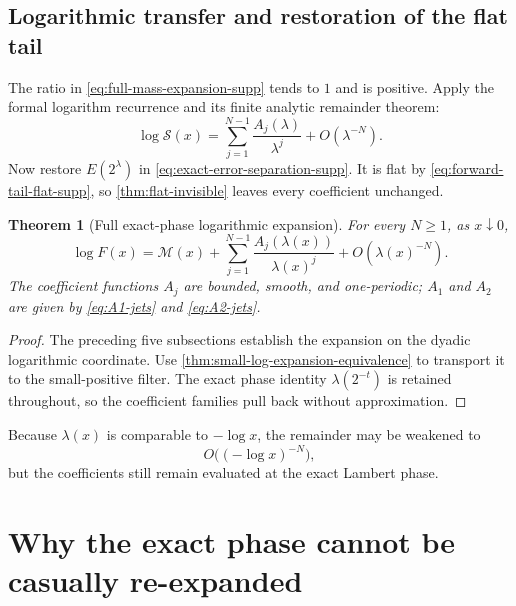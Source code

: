 \documentclass[11pt,oneside]{article}
\newtheorem{theorem}{Theorem}[section]
\theoremstyle{definition}
\theoremstyle{remark}
\begin{document}
\subsection{Logarithmic transfer and restoration of the flat tail}

The ratio in \eqref{eq:full-mass-expansion-supp} tends to $1$ and is positive.  Apply the
formal logarithm recurrence and its finite analytic remainder theorem:
\begin{equation}
 \log\mathcal S(x)=
 \sum_{j=1}^{N-1}\frac{A_j(\lambda)}{\lambda^j}
 +O(\lambda^{-N}).
 \label{eq:full-log-mass-expansion-supp}
\end{equation}
Now restore $E(2^\lambda)$ in \eqref{eq:exact-error-separation-supp}.  It is flat by
\eqref{eq:forward-tail-flat-supp}, so \cref{thm:flat-invisible} leaves every coefficient
unchanged.

\begin{theorem}[Full exact-phase logarithmic expansion]
\label{thm:full-exact-phase-expansion}
For every $N\ge1$, as $x\downarrow0$,
\begin{equation}
 \boxed{
 \log F(x)=\mathcal M(x)+
 \sum_{j=1}^{N-1}\frac{A_j(\lambda(x))}{\lambda(x)^j}
 +O\!\left(\lambda(x)^{-N}\right).}
 \label{eq:full-exact-phase-expansion}
\end{equation}
The coefficient functions $A_j$ are bounded, smooth, and one-periodic; $A_1$ and $A_2$ are
given by \eqref{eq:A1-jets} and \eqref{eq:A2-jets}.
\end{theorem}

\begin{proof}
The preceding five subsections establish the expansion on the dyadic logarithmic coordinate.
Use \cref{thm:small-log-expansion-equivalence} to transport it to the small-positive filter.
The exact phase identity $\lambda(2^{-t})$ is retained throughout, so the coefficient
families pull back without approximation.
\end{proof}

Because $\lambda(x)$ is comparable to $-\log x$, the remainder may be weakened to
\begin{equation}
 O\bigl(({-\log x})^{-N}\bigr),
 \label{eq:full-expansion-neglog-rate}
\end{equation}
but the coefficients still remain evaluated at the exact Lambert phase.

\section{Why the exact phase cannot be casually re-expanded}
\label{sec:exact-phase-boundary}
\end{document}
